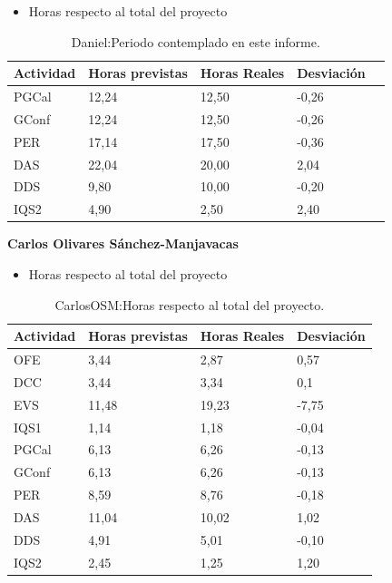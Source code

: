 \begin{itemize}
\item Horas respecto al total del proyecto
\end{itemize}
\begin{table}[H]
\begin{center}
\begin{tabular}{ l l l l l }
  Actividad & Horas previstas & Horas Reales & Desviación \\ \hline \hline
PGCal	&	12,24	&	12,50	&	-0,26	\\ \hline
GConf	&	12,24	&	12,50	&	-0,26	\\ \hline
PER	&	17,14	&	17,50	&	-0,36	\\ \hline
DAS	&	22,04	&	20,00	&	2,04	\\ \hline
DDS	&	9,80	&	10,00	&	-0,20	\\ \hline
IQS2	&	4,90	&	2,50	&	2,40	\\ \hline
\end{tabular}
\caption{Daniel:Periodo contemplado en este informe.}
\label{tab:Daniel:PeriodoContempladoInforme_2}
\end{center}
\end{table}

\newpage


\textbf{Carlos Olivares Sánchez-Manjavacas}
\begin{itemize}
\item Horas respecto al total del proyecto
\end{itemize}
\begin{table}[H]
\begin{center}
\begin{tabular}{ l l l l }
  Actividad & Horas previstas & Horas Reales & Desviación \\ \hline \hline
OFE	&	3,44	&	2,87	&	0,57	\\ \hline
DCC	&	3,44	&	3,34	&	0,1	\\ \hline
EVS	&	11,48	&	19,23	&	-7,75	\\ \hline
IQS1	&	1,14	&	1,18	&	-0,04	\\ \hline
PGCal	&	6,13	&	6,26	&	-0,13	\\ \hline
GConf	&	6,13	&	6,26	&	-0,13	\\ \hline
PER	&	8,59	&	8,76	&	-0,18	\\ \hline
DAS	&	11,04	&	10,02	&	1,02	\\ \hline
DDS	&	4,91	&	5,01	&	-0,10	\\ \hline
IQS2	&	2,45	&	1,25	&	1,20	\\ \hline
\end{tabular}
\caption{CarlosOSM:Horas respecto al total del proyecto.}
\label{tab:CarlosOSM:HorasTotalInforme_2}
\end{center}
\end{table}

